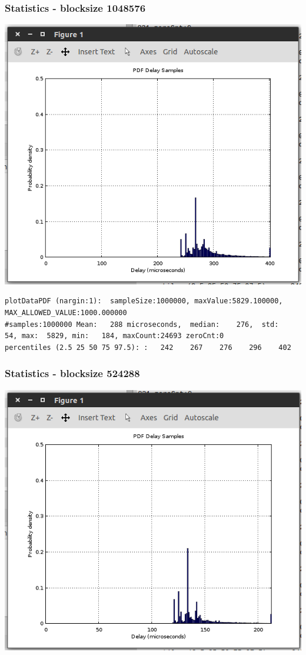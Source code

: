\documentclass{article}
\begin{document}
\subsubsection{Statistics - blocksize 1048576}

\includegraphics{q3/exp1/bs1m}

\begin{lstlisting}
plotDataPDF (nargin:1):  sampleSize:1000000, maxValue:5829.100000,  MAX_ALLOWED_VALUE:1000.000000
#samples:1000000 Mean:   288 microseconds,  median:    276,  std:     54, max:  5829, min:   184, maxCount:24693 zeroCnt:0
percentiles (2.5 25 50 75 97.5): :   242    267    276    296    402
\end{lstlisting}

\subsubsection{Statistics - blocksize 524288}

\includegraphics{q3/exp1/bs500k}
\end{document}
